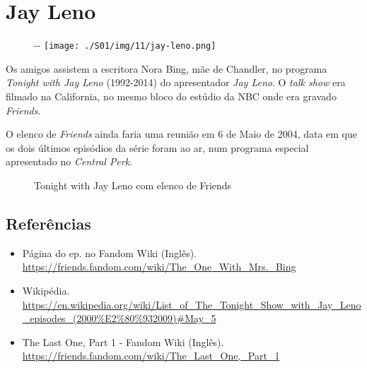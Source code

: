\hypertarget{jay-leno}{%
\section{Jay Leno}\label{jay-leno}}

\begin{figure}[!ht]
  \begin{adjustwidth}{-\oddsidemargin-1in}{-\rightmargin}
    \centering
    \texttt{[image: ./S01/img/11/jay-leno.png]}
  \end{adjustwidth}
\end{figure}

Os amigos assistem a escritora Nora Bing, mãe de Chandler, no programa
\emph{Tonight with Jay Leno} (1992-2014) do apresentador \emph{Jay
Leno}. O \emph{talk show} era filmado na California, no mesmo bloco do
estúdio da NBC onde era gravado \emph{Friends}.

O elenco de \emph{Friends} ainda faria uma reunião em 6 de Maio de 2004,
data em que os dois últimos episódios da série foram ao ar, num programa
especial apresentado no \emph{Central Perk}.

\begin{figure}
  \centering
    \caption{Tonight with Jay Leno com elenco de Friends\label{fig:tonight-with-jay-leno-com-elenco-de-friends}}
\end{figure}

\hypertarget{referuxeancias}{%
\subsection{Referências}\label{referuxeancias}}

\begin{itemize}
\tightlist
\item
  \sloppy Página do ep. no Fandom Wiki (Inglês). \url{https://friends.fandom.com/wiki/The_One_With_Mrs._Bing}
\item
  \sloppy Wikipédia. \url{https://en.wikipedia.org/wiki/List_of_The_Tonight_Show_with_Jay_Leno_episodes_(2000%E2%80%932009)#May_5}
\item
  \sloppy The Last One, Part 1 - Fandom Wiki (Inglês). \url{https://friends.fandom.com/wiki/The_Last_One,_Part_1}
\end{itemize}


